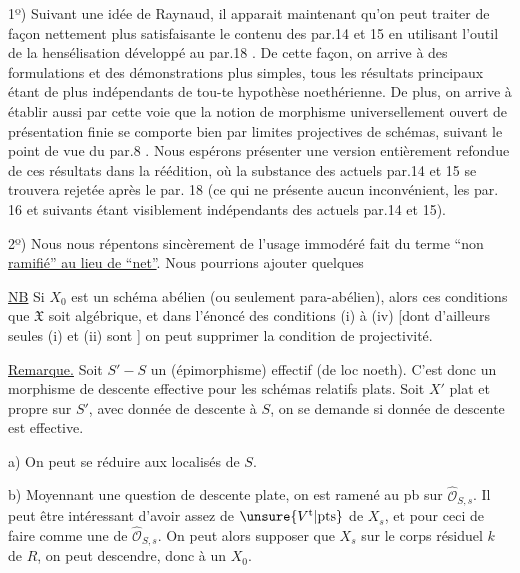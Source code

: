 1º) Suivant une idée de Raynaud, il apparait maintenant qu'on peut traiter de façon nettement plus satisfaisante le contenu des par.14 et 15 en utilisant l'outil de la hensélisation développé au par.18 . De cette façon, on arrive à des formulations et des démonstrations plus simples, tous les résultats principaux étant de plus indépendants de tou-te hypothèse noethérienne. De plus, on arrive à établir aussi par cette voie que la notion de morphisme universellement ouvert  de présentation finie se comporte bien par limites projectives de schémas, suivant le point de vue du par.8 . Nous espérons présenter une version entièrement refondue de ces résultats dans la réédition, où  la substance des actuels par.14 et 15 se trouvera rejetée après le par. 18 (ce qui ne présente aucun inconvénient, les par. 16 et suivants étant visiblement indépendants des actuels par.14 et 15).

2º) Nous nous répentons sincèrement de l'usage immodéré fait du terme ``non \uline{ramifié'' au lieu de ``net''}. Nous pourrions ajouter quelques


\uline{NB} Si $X_0$ est un schéma abélien  (ou seulement para-abélien), alors ces conditions   que $\mathfrak X$ soit algébrique, et dans l'énoncé des conditions (i) à (iv) [dont d'ailleurs seules (i) et (ii) sont ] on peut supprimer la condition de projectivité.

\uline{Remarque.} Soit $S'\mathbin{-}S$ un
(épimorphisme) effectif (de loc noeth). C'est donc un morphisme de descente effective pour les schémas relatifs plats. Soit $X'$ plat et propre sur $S'$, avec donnée de descente à $S$, on  se demande si donnée de descente est effective.

a) On peut se réduire aux localisés  de $S$.

b) Moyennant une question de descente   plate, on est ramené au pb sur $\widehat{\mathcal O}_{S,s}$. Il peut être intéressant d'avoir  assez de $\unsure{V^{\mathrm t}|\mathrm{pts}}$ de $X_s$, et pour ceci de faire comme une     de $\widehat{\mathcal O}_{S,s}$. On peut alors supposer que $X_s$ sur le corps résiduel $k$ de $R$, on peut descendre, donc  à un $X_0$.

